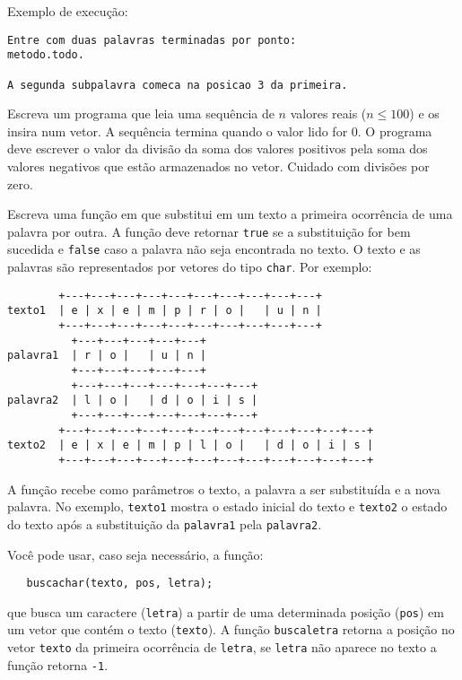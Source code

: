 \noindent
{Exemplo de execução: }
\small
\begin{verbatim}
Entre com duas palavras terminadas por ponto:
metodo.todo.

A segunda subpalavra comeca na posicao 3 da primeira.
\end{verbatim}



\item Escreva um programa que leia uma sequência de $n$ valores
reais ($n \leq 100$) e os insira num vetor.  A sequência termina quando o
valor lido for 0.  O programa deve escrever o valor da divisão 
da soma dos valores positivos pela soma dos valores
negativos que estão armazenados no vetor. Cuidado com divisões por zero.

\item Escreva uma função em  que substitui em um texto a primeira
ocorrência de  uma   palavra por   outra.  A  função  deve  retornar
\verb+true+ se a subs\-ti\-tui\-ção for bem sucedida e
\verb+false+ caso a palavra  não seja encontrada no  texto.  O texto e
as palavras são  representados  por vetores  do  tipo \verb+char+. Por
exemplo:
\vspace{-0.2cm}
\begin{center}
\begin{small}
\begin{verbatim}
        +---+---+---+---+---+---+---+---+---+---+
texto1  | e | x | e | m | p | r | o |   | u | n |
        +---+---+---+---+---+---+---+---+---+---+
          +---+---+---+---+---+
palavra1  | r | o |   | u | n |
          +---+---+---+---+---+
          +---+---+---+---+---+---+---+
palavra2  | l | o |   | d | o | i | s |
          +---+---+---+---+---+---+---+
        +---+---+---+---+---+---+---+---+---+---+---+---+
texto2  | e | x | e | m | p | l | o |   | d | o | i | s |
        +---+---+---+---+---+---+---+---+---+---+---+---+
\end{verbatim}
\end{small}
\end{center}
\vspace{-0.2cm}
A função recebe como parâmetros o texto, a palavra a ser substituída e
a nova palavra.  No exemplo, \verb+texto1+  mostra o estado inicial do
texto  e \verb+texto2+  o   estado do texto  após  a   substituição da
\verb+palavra1+ pela \verb+palavra2+.

Você pode usar, caso seja necessário, a função:
\begin{center}
\begin{small}
\begin{verbatim}
   buscachar(texto, pos, letra);
\end{verbatim}
\end{small}
\end{center}
que busca  um  caractere (\verb+letra+) a  partir   de uma determinada
posição (\verb+pos+) em um vetor que  contém o texto (\verb+texto+). A
função \verb+buscaletra+  retorna a posição  no  vetor \verb+texto+ da
primeira ocorrência  de  \verb+letra+, se \verb+letra+  não aparece no
texto a função retorna \verb+-1+.

